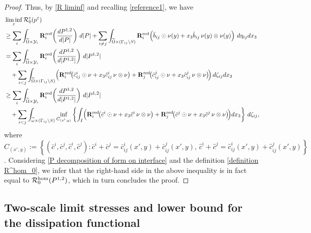 \documentclass[reqno,10pt]{amsart}
\numberwithin{equation}{section}
\theoremstyle{remark}
\newcommand{\RED}{\color{black}}
\newcommand{\BLACK}{\color{black}}
\newcommand{\calR}{\mathcal{R}}
\newcommand{\calY}{\mathcal{Y}}
\newcommand{\eps}{\varepsilon}
\newcommand{\ext}[1]{\widetilde{#1}}
\newcommand{\disspot}{\mathbf{R}}
\begin{document}
\begin{proof}
Thus, by \eqref{R liminf} {\RED and recalling \eqref{reference1}\BLACK}, we have 
{\allowdisplaybreaks
\begin{align*}
	& \liminf\limits_{\eps} \calR^{\eps}_{0}(p^\eps)
	\\*& \geq \sum_{i} \int_{\ext{\Omega} \times \calY_i} \disspot^{\rm red}_i\!\left(\frac{dP^{1,2}}{d|P|}\right) \,d|P| + \sum_{i \neq j} \int_{\ext{\Omega} \times (\Gamma_{ij} \setminus S)} \disspot_i^{\rm red}\!\left(\bar{b}_{ij} \odot \nu(y) + x_3 \hat{b}_{ij}\, \nu(y) \otimes \nu(y) \right) \,d\eta_{ij} dx_3
	\\& = \sum_{i} \int_{\ext{\Omega} \times \calY_i} \disspot^{\rm red}_i\!\left(\frac{dP^{1,2}}{d|P^{1,2}|}\right) \,d|P^{1,2}| 
	\\*& \hspace{1em}+ \sum_{i < j} \int_{\ext{\Omega} \times (\Gamma_{ij} \setminus S)} \!\Big( \disspot_i^{\rm red}\!\big(\bar{c}_{ij}^i \odot \nu + x_3 \hat{c}_{ij}^i\, \nu \otimes \nu\big) + \disspot_j^{\rm red}\!\big(\bar{c}_{ij}^j \odot \nu + x_3 \hat{c}_{ij}^j\, \nu \otimes \nu\big) \!\Big) \,d\zeta_{ij} dx_3
	\\& \geq \sum_{i} \int_{\ext{\Omega} \times \calY_i} \disspot^{\rm red}_i\!\left(\frac{dP^{1,2}}{d|P^{1,2}|}\right) \,d|P^{1,2}| 
	\\*& \hspace{1em}+ \sum_{i < j} \int_{\ext{\omega} \times (\Gamma_{ij} \setminus S)} \inf\limits_{C_{(x',y)}}\left\{ \int_I \!\Big( \disspot_i^{\rm red}\!\big(\bar{c}^i \odot \nu + x_3 \hat{c}^i\, \nu \otimes \nu\big) + \disspot_j^{\rm red}\!\big(\bar{c}^j \odot \nu + x_3 \hat{c}^j\, \nu \otimes \nu\big) \!\Big) dx_3 \right\} \,d\zeta_{ij},
\end{align*}
}\noindent
where $C_{(x',y)} := \left\{ (\bar{c}^i,\bar{c}^j,\hat{c}^i,\hat{c}^j) : \bar{c}^i+\bar{c}^j = \bar{c}_{ij}^i(x',y)+\bar{c}_{ij}^j(x',y),\, \hat{c}^i+\hat{c}^j = \hat{c}_{ij}^i(x',y)+\hat{c}_{ij}^j(x',y) \right\}$.
Considering \eqref{P decomposition of form on interface} and the definition \eqref{definition R^hom_0}, we infer that the right-hand side in the above inequality is in fact equal to $\calR^{\rm hom}_{0}(P^{1,2})$,
which in turn concludes the proof.
\end{proof}

\subsection{Two-scale limit stresses and lower bound for the dissipation functional} \label{section two-scale limit stresses}
\end{document}
